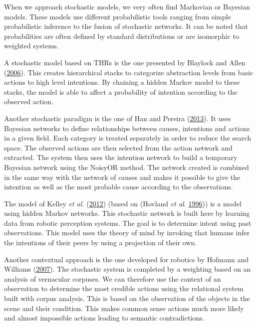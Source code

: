 \documentclass[11pt,a4paper,twoside,openright,titlepage,numbers=noenddot,headinclude,cleardoublepage=empty,openany]{scrreprt}
\theoremstyle{plain}
\theoremstyle{definition}
\theoremstyle{remark}
\begin{document}
When we approach stochastic models, we very often find Markovian or
Bayesian models. These models use different probabilistic tools ranging
from simple probabilistic inference to the fusion of stochastic
networks. It can be noted that probabilities are often defined by
standard distributions or are isomorphic to weighted systems.

A stochastic model based on THRs is the one presented by Blaylock and
Allen (\protect\hyperlink{ref-blaylock_fast_2006}{2006}). This creates
hierarchical stacks to categorize abstraction levels from basic actions
to high level intentions. By chaining a hidden Markov model to these
stacks, the model is able to affect a probability of intention according
to the observed action.

Another stochastic paradigm is the one of Han and Pereira
(\protect\hyperlink{ref-han_contextdependent_2013}{2013}). It uses
Bayesian networks to define relationships between causes, intentions and
actions in a given field. Each category is treated separately in order
to reduce the search space. The observed actions are then selected from
the action network and extracted. The system then uses the intention
network to build a temporary Bayesian network using the NoisyOR method.
The network created is combined in the same way with the network of
causes and makes it possible to give the intention as well as the most
probable cause according to the observations.

The model of Kelley \emph{et al.}
(\protect\hyperlink{ref-kelley_contextbased_2012}{2012}) (based on
(Hovland \emph{et al.}
\protect\hyperlink{ref-hovland_skill_1996}{1996})) is a model using
hidden Markov networks. This stochastic network is built here by
learning data from robotic perception systems. The goal is to determine
intent using past observations. This model uses the theory of mind by
invoking that humans infer the intentions of their peers by using a
projection of their own.

Another contextual approach is the one developed for robotics by Hofmann
and Williams (\protect\hyperlink{ref-hofmann_intent_2007a}{2007}). The
stochastic system is completed by a weighting based on an analysis of
vernacular corpuses. We can therefore use the context of an observation
to determine the most credible actions using the relational system built
with corpus analysis. This is based on the observation of the objects in
the scene and their condition. This makes common sense actions much more
likely and almost impossible actions leading to semantic contradictions.
\end{document}
